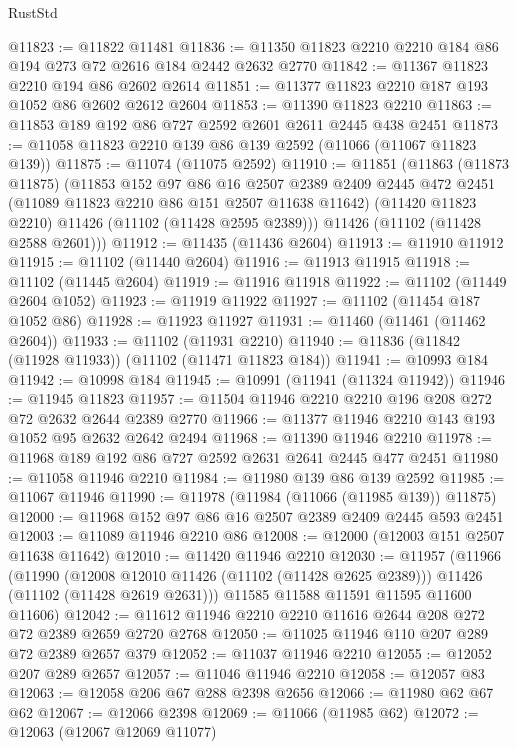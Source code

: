 \begin{lexlean}{RustStd}
\begin{coremodule}
@11823 := @11822 @11481
@11836 := @11350 @11823 @2210 @2210 @184 @86 @194 @273 @72 @2616 @184 @2442 @2632 @2770
@11842 := @11367 @11823 @2210 @194 @86 @2602 @2614
@11851 := @11377 @11823 @2210 @187 @193 @1052 @86 @2602 @2612 @2604
@11853 := @11390 @11823 @2210
@11863 := @11853 @189 @192 @86 @727 @2592 @2601 @2611 @2445 @438 @2451
@11873 := @11058 @11823 @2210 @139 @86 @139 @2592 (@11066 (@11067 @11823 @139))
@11875 := @11074 (@11075 @2592)
@11910 := @11851
    (@11863
      (@11873 @11875)
      (@11853
        @152
        @97
        @86
        @16
        @2507
        @2389
        @2409
        @2445
        @472
        @2451
        (@11089 @11823 @2210 @86 @151 @2507 @11638 @11642)
        (@11420 @11823 @2210)
        @11426
        (@11102 (@11428 @2595 @2389)))
      @11426
      (@11102 (@11428 @2588 @2601)))
@11912 := @11435 (@11436 @2604)
@11913 := @11910 @11912
@11915 := @11102 (@11440 @2604)
@11916 := @11913 @11915
@11918 := @11102 (@11445 @2604)
@11919 := @11916 @11918
@11922 := @11102 (@11449 @2604 @1052)
@11923 := @11919 @11922
@11927 := @11102 (@11454 @187 @1052 @86)
@11928 := @11923 @11927
@11931 := @11460 (@11461 (@11462 @2604))
@11933 := @11102 (@11931 @2210)
@11940 := @11836 (@11842 (@11928 @11933)) (@11102 (@11471 @11823 @184))
@11941 := @10993 @184
@11942 := @10998 @184
@11945 := @10991 (@11941 (@11324 @11942))
@11946 := @11945 @11823
@11957 := @11504 @11946 @2210 @2210 @196 @208 @272 @72 @2632 @2644 @2389 @2770
@11966 := @11377 @11946 @2210 @143 @193 @1052 @95 @2632 @2642 @2494
@11968 := @11390 @11946 @2210
@11978 := @11968 @189 @192 @86 @727 @2592 @2631 @2641 @2445 @477 @2451
@11980 := @11058 @11946 @2210
@11984 := @11980 @139 @86 @139 @2592
@11985 := @11067 @11946
@11990 := @11978 (@11984 (@11066 (@11985 @139)) @11875)
@12000 := @11968 @152 @97 @86 @16 @2507 @2389 @2409 @2445 @593 @2451
@12003 := @11089 @11946 @2210 @86
@12008 := @12000 (@12003 @151 @2507 @11638 @11642)
@12010 := @11420 @11946 @2210
@12030 := @11957
    (@11966
      (@11990
        (@12008 @12010 @11426 (@11102 (@11428 @2625 @2389)))
        @11426
        (@11102 (@11428 @2619 @2631)))
      @11585
      @11588
      @11591
      @11595
      @11600
      @11606)
@12042 := @11612 @11946 @2210 @2210 @11616 @2644 @208 @272 @72 @2389 @2659 @2720 @2768
@12050 := @11025 @11946 @110 @207 @289 @72 @2389 @2657 @379
@12052 := @11037 @11946 @2210
@12055 := @12052 @207 @289 @2657
@12057 := @11046 @11946 @2210
@12058 := @12057 @83
@12063 := @12058 @206 @67 @288 @2398 @2656
@12066 := @11980 @62 @67 @62
@12067 := @12066 @2398
@12069 := @11066 (@11985 @62)
@12072 := @12063 (@12067 @12069 @11077)

\end{coremodule}
\end{lexlean}
